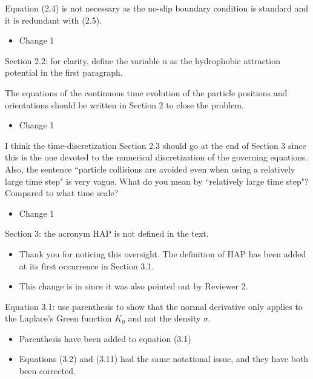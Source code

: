 \documentclass[11pt]{article}
\newcommand{\comment}[1]{{\color{blue} #1}}
\begin{document}
\noindent
\comment{Equation (2.4) is not necessary as the no-slip boundary
condition is standard and it is redundant with (2.5).}
\begin{itemize}
  \item Change 1 
\end{itemize}

\noindent
\comment{Section 2.2: for clarity, define the variable u as the
hydrophobic attraction potential in the first paragraph.}

\noindent
\comment{The equations of the continuous time evolution of the particle
positions and orientations should be written in Section 2 to close the
problem.}
\begin{itemize}
  \item Change 1 
\end{itemize}

\noindent
\comment{I think the time-discretization Section 2.3 should go at the
end of Section 3 since this is the one devoted to the numerical
discretization of the governing equations. Also, the sentence ``particle
collisions are avoided even when using a relatively large time step" is
very vague.  What do you mean by ``relatively large time step"? Compared
to what time scale?}
\begin{itemize}
  \item Change 1 
\end{itemize}

\noindent
\comment{Section 3: the acronym HAP is not defined in the text.}
\begin{itemize}
  \item Thank you for noticing this oversight. The definition of HAP has
    been added at its first occurrence in Section 3.1. 
  \item This change is in \textcolor{green} since it was also pointed
    out by Reviewer 2.
\end{itemize}

\noindent
\comment{Equation 3.1: use parenthesis to show that the normal
derivative only applies to the Laplace’s Green function $K_0$ and not
the density $\sigma$.}
\begin{itemize}
  \item Parenthesis have been added to equation (3.1) 

  \item Equations (3.2) and (3.11) had the same notational issue, and
    they have both been corrected.
\end{itemize}
\end{document}
